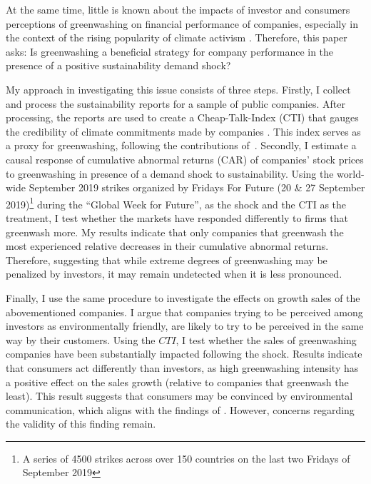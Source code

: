 \documentclass[12pt]{article}
\begin{document}
At the same time, little is known about the impacts of investor and consumers perceptions of greenwashing on financial performance of companies, especially in the context of the rising popularity of climate activism \parencite{pew2021genz}. Therefore, this paper asks: Is greenwashing a beneficial strategy for company performance in the presence of a positive sustainability demand shock?

My approach in investigating this issue consists of three steps. Firstly, I collect and process the sustainability reports for a sample of public companies. After processing, the reports are used to create a Cheap-Talk-Index (CTI) that gauges the credibility of climate commitments made by companies \parencite{binglerHowCheapTalk2024}. This index serves as a proxy for greenwashing, following the contributions of~\cite{coenAreCorporateClimate2022}. Secondly, I estimate a causal response of cumulative abnormal returns (CAR) of companies' stock prices to greenwashing in presence of a demand shock to sustainability. Using the world-wide September 2019 strikes organized by Fridays For Future (20 \& 27 September 2019)\footnote{A series of 4500 strikes across over 150 countries on the last two Fridays of September 2019} during the ``Global Week for Future'', as the shock and the CTI as the treatment, I test whether the markets have responded differently to firms that greenwash more. My results indicate that only companies that greenwash the most experienced relative decreases in their cumulative abnormal returns. Therefore, suggesting that while extreme degrees of greenwashing may be penalized by investors, it may remain undetected when it is less pronounced. 

Finally, I use the same procedure to investigate the effects on growth sales of the abovementioned companies. I argue that companies trying to be perceived among investors as environmentally friendly, are likely to try to be perceived in the same way by their customers. Using the $CTI$, I test whether the sales of greenwashing companies have been substantially impacted following the shock. Results indicate that consumers act differently than investors, as high greenwashing intensity has a positive effect on the sales growth (relative to companies that greenwash the least). This result suggests that consumers may be convinced by environmental communication, which aligns with the findings of \textcite{schmuckMisleadingConsumersGreen2018,parguelCanEvokingNature2015}. However, concerns regarding the validity of this finding remain.
 
\end{document}
